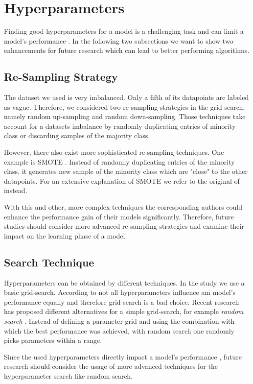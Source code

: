 \section{Hyperparameters}
\label{chp:future_work:sec:hyperparameters}
Finding good hyperparameters for a model is a challenging task and can limit a model's performance \parencite{Bergstra:2011,Zeiler:2012}.
In the following two subsections we want to show two enhancements for future research which can lead to better performing algorithms.

\subsection{Re-Sampling Strategy}
\label{chp:future_work:sec:hyperparameters:re_sampling_strategy}
The dataset we used is very imbalanced.
Only a fifth of its datapoints are labeled as vague.
Therefore, we considered two re-sampling strategies in the grid-search, namely random up-sampling and random down-sampling.
Those techniques take account for a datasets imbalance by randomly duplicating entries of minority class or discarding samples of the majority class.

However, there also exist more sophisticated re-sampling techniques.
One example is \ac{SMOTE} \parencite{Chawla:2002}.
Instead of randomly duplicating entries of the minority class, it generates new sample of the minority class which are "close" to the other datapoints.
For an extensive explanation of \ac{SMOTE} we refer to the original of \textcite{Chawla:2002} instead.

With this and other, more complex techniques the corresponding authors could enhance the performance gain of their models significantly.
Therefore, future studies should consider more advanced re-sampling strategies and examine their impact on the learning phase of a model.

\subsection{Search Technique}
\label{chp:future_work:sec:hyperparameters:search_technique}
Hyperparameters can be obtained by different techniques.
In the study we use a basic grid-search.
According to \textcite{Bergstra:2012} not all hyperparameters influence am model's performance equally and therefore grid-search is a bad choice.
Recent research has proposed different alternatives for a simple grid-search, for example \textit{random search} \parencite{Bergstra:2012}.
Instead of defining a parameter grid and using the combination with which the best performance was achieved, with random search one randomly picks parameters within a range.

Since the used hyperparameters directly impact a model's performance \parencite{Claesen:2015}, future research should consider the usage of more advanced techniques for the hyperparameter search like random search.

